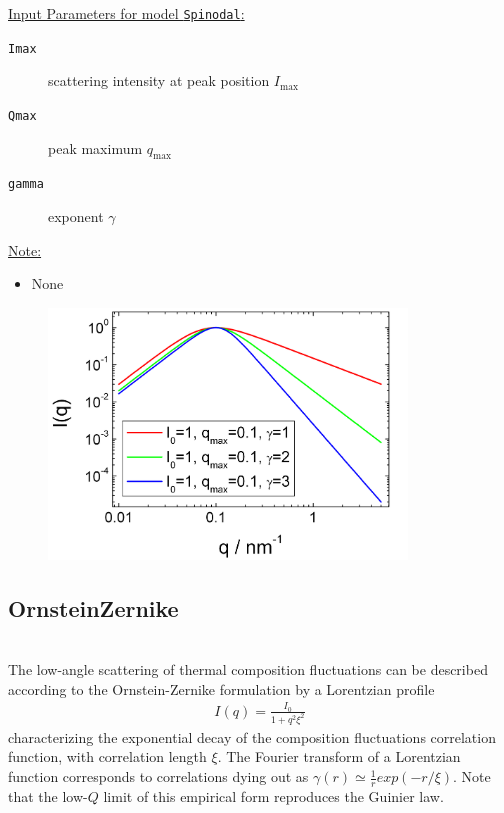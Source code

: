 \vspace{5mm}

\underline{Input Parameters for model \texttt{Spinodal}:}\\
\begin{description}
\item[\texttt{Imax}] scattering intensity at peak position $I_\text{max}$
\item[\texttt{Qmax}] peak maximum $q_\text{max}$
\item[\texttt{gamma}] exponent $\gamma$
\end{description}

\underline{Note:}
\begin{itemize}
\item None
\end{itemize}



\begin{figure}[htb]
\begin{center}
\includegraphics[width=0.85\textwidth,height=0.6\textwidth]{spinodalIQ.png}
\end{center}
\caption{} \label{fig:spinodalIQ}
\end{figure}

\clearpage
\subsection{OrnsteinZernike}
\label{sect:Zernike}
 ~\\
The low-angle scattering of thermal composition fluctuations can be
described according to the Ornstein-Zernike formulation by a
Lorentzian profile
\begin{align}
I(q) = \frac{I_0}{1+q^2\xi^2}
\end{align}
characterizing the exponential decay of the composition fluctuations
correlation function, with correlation length $\xi$. The Fourier
transform of a Lorentzian function corresponds to correlations dying
out as $\gamma(r) \simeq \frac{1}{r}exp(-r/\xi)$. Note that the
low-$Q$ limit of this empirical form reproduces the Guinier law.

